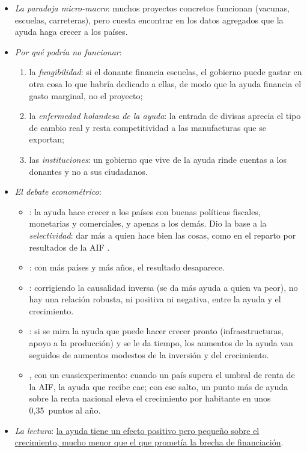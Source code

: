 \documentclass[11pt]{article}
\begin{document}
\begin{itemize}
\item \emph{La paradoja micro-macro}: muchos proyectos concretos funcionan (vacunas, escuelas, carreteras), pero cuesta encontrar en los datos agregados que la ayuda haga crecer a los países.
\item \emph{Por qué podría no funcionar}:
  \begin{enumerate}
  \item la \emph{fungibilidad}: si el donante financia escuelas, el gobierno puede gastar en otra cosa lo que habría dedicado a ellas, de modo que la ayuda financia el gasto marginal, no el proyecto;
  \item la \emph{enfermedad holandesa de la ayuda}: la entrada de divisas aprecia el tipo de cambio real y resta competitividad a las manufacturas que se exportan\nocite{RajanSubramanian2011};
  \item las \emph{instituciones}: un gobierno que vive de la ayuda rinde cuentas a los donantes y no a sus ciudadanos\nocite{Deaton2013}.
  \end{enumerate}
\item \emph{El debate econométrico}:
  \begin{itemize}
  \item \textcite{BurnsideDollar2000}: la ayuda hace crecer a los países con buenas políticas fiscales, monetarias y comerciales, y apenas a los demás. Dio la base a la \emph{selectividad}: dar más a quien hace bien las cosas, como en el reparto por resultados de la AIF .
  \item \textcite{EasterlyLevineRoodman2004}: con más países y más años, el resultado desaparece.
  \item \textcite{RajanSubramanian2008}: corrigiendo la causalidad inversa (se da más ayuda a quien va peor), no hay una relación robusta, ni positiva ni negativa, entre la ayuda y el crecimiento.
  \item \textcite{ClemensEtAl2012}: si se mira la ayuda que puede hacer crecer pronto (infraestructuras, apoyo a la producción) y se le da tiempo, los aumentos de la ayuda van seguidos de aumentos modestos de la inversión y del crecimiento.
  \item \textcite{GalianiEtAl2017}, con un cuasiexperimento: cuando un país supera el umbral de renta de la AIF, la ayuda que recibe cae; con ese salto, un punto más de ayuda sobre la renta nacional eleva el crecimiento por habitante en unos 0,35~puntos al año.
  \end{itemize}
\item \emph{La lectura}: \uline{la ayuda tiene un efecto positivo pero pequeño sobre el crecimiento, mucho menor que el que prometía la brecha de financiación}.
\end{itemize}
\end{document}

